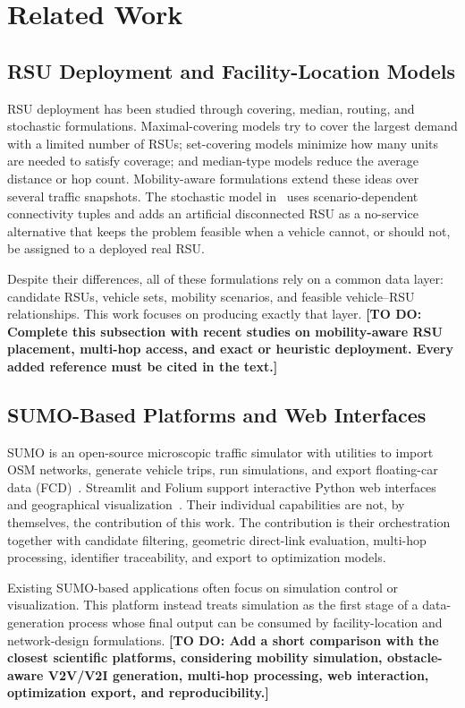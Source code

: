 \documentclass[engproc,proceedingpaper,submit,oneauthor]{Definitions/mdpi}
\newcommand{\todo}[1]{{\color{todored}\textbf{[TO DO: #1]}}}
\begin{document}
\section{Related Work}\label{sec:related}

\subsection{RSU Deployment and Facility-Location Models}
RSU deployment has been studied through covering, median, routing, and stochastic
formulations. Maximal-covering models try to cover the largest demand with a limited
number of RSUs; set-covering models minimize how many units are needed to satisfy
coverage; and median-type models reduce the average distance or hop count.
Mobility-aware formulations extend these ideas over several traffic snapshots. The
stochastic model in~\citep{ref-urquiza} uses scenario-dependent connectivity tuples
and adds an artificial disconnected RSU as a no-service alternative that keeps the
problem feasible when a vehicle cannot, or should not, be assigned to a deployed real
RSU.

Despite their differences, all of these formulations rely on a common data layer:
candidate RSUs, vehicle sets, mobility scenarios, and feasible vehicle--RSU
relationships. This work focuses on producing exactly that layer. \todo{Complete
this subsection with recent studies on mobility-aware RSU placement, multi-hop
access, and exact or heuristic deployment. Every added reference must be cited in the
text.}

\subsection{SUMO-Based Platforms and Web Interfaces}
SUMO is an open-source microscopic traffic simulator with utilities to import OSM
networks, generate vehicle trips, run simulations, and export floating-car data
(FCD)~\citep{ref-sumo,ref-osm}. Streamlit and Folium support interactive Python web
interfaces and geographical visualization~\citep{ref-streamlit,ref-folium}. Their
individual capabilities are not, by themselves, the contribution of this work. The
contribution is their orchestration together with candidate filtering, geometric
direct-link evaluation, multi-hop processing, identifier traceability, and export to
optimization models.

Existing SUMO-based applications often focus on simulation control or visualization.
This platform instead treats simulation as the first stage of a data-generation
process whose final output can be consumed by facility-location and network-design
formulations. \todo{Add a short comparison with the closest scientific platforms,
considering mobility simulation, obstacle-aware V2V/V2I generation, multi-hop
processing, web interaction, optimization export, and reproducibility.}
\end{document}
